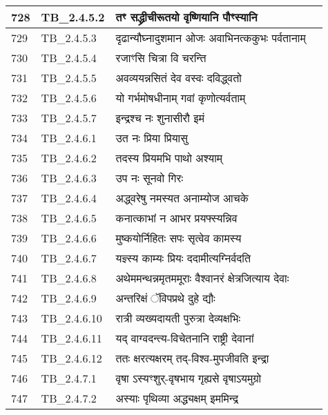 \documentclass[17pt]{extarticle}
\begin{document}
\begin{longtable}{||p{0.4in}||p{0.9in}||p{4.0in}||p{0.9in}||}
            728 & TB\_2.4.5.2 & तꣳ सद्ध्रीचीरूतयो वृष्णियानि पौꣳस्यानि &      \\
        \hline
            729 & TB\_2.4.5.3 & दृढान्यौघ्नादुशमान ओजः अवाभिनत्ककुभः पर्वतानाम् &      \\
        \hline
            730 & TB\_2.4.5.4 & रजाꣳसि चित्रा वि चरन्ति &      \\
        \hline
            731 & TB\_2.4.5.5 & अवव्ययन्नसितं देव वस्वः दविद्ध्वतो &      \\
        \hline
            732 & TB\_2.4.5.6 & यो गर्भमोषधीनाम् गवां कृणोत्यर्वताम् &      \\
        \hline
            733 & TB\_2.4.5.7 & इन्द्रश्च नः शुनासीरौ इमं &      \\
        \hline
            734 & TB\_2.4.6.1 & उत नः प्रिया प्रियासु &      \\
        \hline
            735 & TB\_2.4.6.2 & तदस्य प्रियमभि पाथो अश्याम् &      \\
        \hline
            736 & TB\_2.4.6.3 & उप नः सूनवो गिरः &      \\
        \hline
            737 & TB\_2.4.6.4 & अद्ध्वरेषु नमस्यत अनाम्योज आचके &      \\
        \hline
            738 & TB\_2.4.6.5 & कनात्काभां न आभर प्रयफ्स्यन्निव &      \\
        \hline
            739 & TB\_2.4.6.6 & मुष्कयोर्निहितः सपः सृत्वेव कामस्य &      \\
        \hline
            740 & TB\_2.4.6.7 & यज्ञ्स्य काम्यः प्रियः ददामीत्यग्निर्वदति &      \\
        \hline
            741 & TB\_2.4.6.8 & अथेममन्थन्नमृतममूराः वैश्वानरं क्षेत्रजित्याय देवाः &      \\
        \hline
            742 & TB\_2.4.6.9 & अन्तरिक्षं ॅविपप्रथे दुहे द्यौः &      \\
        \hline
            743 & TB\_2.4.6.10 & रात्री व्यख्यदायती पुरुत्रा देव्यक्षभिः &      \\
        \hline
            744 & TB\_2.4.6.11 & यद् वाग्वदन्त्य{-}विचेतनानि राष्ट्री देवानां &      \\
        \hline
            745 & TB\_2.4.6.12 & ततः क्षरत्यक्षरम् तद्{-}विश्व{-}मुपजीवति इन्द्रा &      \\
        \hline
            746 & TB\_2.4.7.1 & वृषा ऽस्यꣳशुर्{-}वृषभाय गृह्यसे वृषाऽयमुग्रो &      \\
        \hline
            747 & TB\_2.4.7.2 & अस्याः पृथिव्या अद्ध्यक्षम् इममिन्द्र &      \\

\end{longtable}
\end{document}
